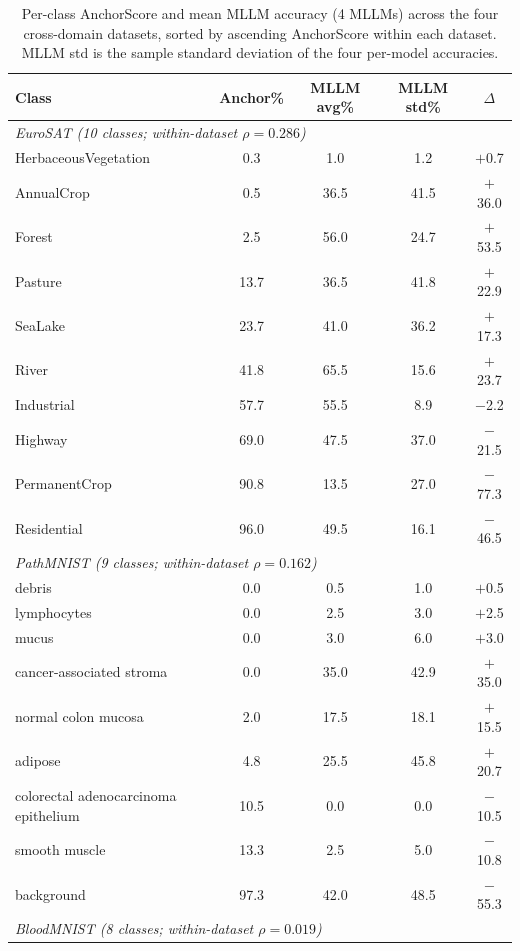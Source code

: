\documentclass[11pt,a4paper]{article}
\begin{document}
\begin{table}[t]
\caption{Per-class AnchorScore and mean MLLM accuracy (4 MLLMs) across the four cross-domain datasets, sorted by ascending AnchorScore within each dataset. MLLM std is the sample standard deviation of the four per-model accuracies.}
\label{tab:cross_domain_per_class}
\centering
\footnotesize
\setlength{\tabcolsep}{2.8pt}
\begin{tabular}{lcccc}
\toprule
\textbf{Class} & \textbf{Anchor\%} & \textbf{MLLM avg\%} & \textbf{MLLM std\%} & $\Delta$ \\
\midrule
\multicolumn{5}{l}{\textit{EuroSAT (10 classes; within-dataset $\rho=0.286$)}} \\
HerbaceousVegetation & 0.3 & 1.0 & 1.2 & $+$0.7 \\
AnnualCrop & 0.5 & 36.5 & 41.5 & $+$36.0 \\
Forest & 2.5 & 56.0 & 24.7 & $+$53.5 \\
Pasture & 13.7 & 36.5 & 41.8 & $+$22.9 \\
SeaLake & 23.7 & 41.0 & 36.2 & $+$17.3 \\
River & 41.8 & 65.5 & 15.6 & $+$23.7 \\
Industrial & 57.7 & 55.5 & 8.9 & $-$2.2 \\
Highway & 69.0 & 47.5 & 37.0 & $-$21.5 \\
PermanentCrop & 90.8 & 13.5 & 27.0 & $-$77.3 \\
Residential & 96.0 & 49.5 & 16.1 & $-$46.5 \\
\midrule
\multicolumn{5}{l}{\textit{PathMNIST (9 classes; within-dataset $\rho=0.162$)}} \\
debris & 0.0 & 0.5 & 1.0 & $+$0.5 \\
lymphocytes & 0.0 & 2.5 & 3.0 & $+$2.5 \\
mucus & 0.0 & 3.0 & 6.0 & $+$3.0 \\
cancer-associated stroma & 0.0 & 35.0 & 42.9 & $+$35.0 \\
normal colon mucosa & 2.0 & 17.5 & 18.1 & $+$15.5 \\
adipose & 4.8 & 25.5 & 45.8 & $+$20.7 \\
colorectal adenocarcinoma epithelium & 10.5 & 0.0 & 0.0 & $-$10.5 \\
smooth muscle & 13.3 & 2.5 & 5.0 & $-$10.8 \\
background & 97.3 & 42.0 & 48.5 & $-$55.3 \\
\midrule
\multicolumn{5}{l}{\textit{BloodMNIST (8 classes; within-dataset $\rho=0.019$)}} \\

\end{tabular}
\end{table}
\end{document}
